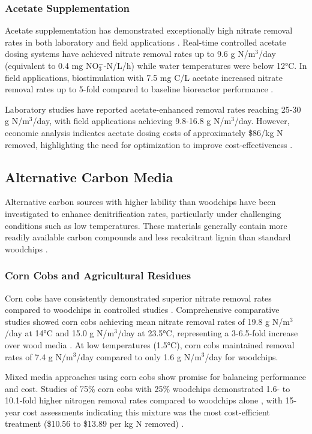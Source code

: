 \documentclass[12pt,a4paper]{article}
\begin{document}
\subsubsection{Acetate Supplementation}

Acetate supplementation has demonstrated exceptionally high nitrate removal rates in both laboratory and field applications \citep{RN196}. Real-time controlled acetate dosing systems have achieved nitrate removal rates up to 9.6 g N/m$^3$/day (equivalent to 0.4 mg NO$_3^-$-N/L/h) while water temperatures were below 12°C. In field applications, biostimulation with 7.5 mg C/L acetate increased nitrate removal rates up to 5-fold compared to baseline bioreactor performance \citep{RN196}.

Laboratory studies have reported acetate-enhanced removal rates reaching 25-30 g N/m$^3$/day, with field applications achieving 9.8-16.8 g N/m$^3$/day. However, economic analysis indicates acetate dosing costs of approximately \$86/kg N removed, highlighting the need for optimization to improve cost-effectiveness \citep{RN196}.

\subsection{Alternative Carbon Media}

Alternative carbon sources with higher lability than woodchips have been investigated to enhance denitrification rates, particularly under challenging conditions such as low temperatures. These materials generally contain more readily available carbon compounds and less recalcitrant lignin than standard woodchips \citep{RN624}.

\subsubsection{Corn Cobs and Agricultural Residues}

Corn cobs have consistently demonstrated superior nitrate removal rates compared to woodchips in controlled studies \citep{RN350, RN624}. Comprehensive comparative studies showed corn cobs achieving mean nitrate removal rates of 19.8 g N/m$^3$/day at 14°C and 15.0 g N/m$^3$/day at 23.5°C, representing a 3-6.5-fold increase over wood media \citep{RN350, RN624}. At low temperatures (1.5°C), corn cobs maintained removal rates of 7.4 g N/m$^3$/day compared to only 1.6 g N/m$^3$/day for woodchips.

Mixed media approaches using corn cobs show promise for balancing performance and cost. Studies of 75\% corn cobs with 25\% woodchips demonstrated 1.6- to 10.1-fold higher nitrogen removal rates compared to woodchips alone \citep{RN350}, with 15-year cost assessments indicating this mixture was the most cost-efficient treatment (\$10.56 to \$13.89 per kg N removed) \citep{RN350}.
\end{document}
